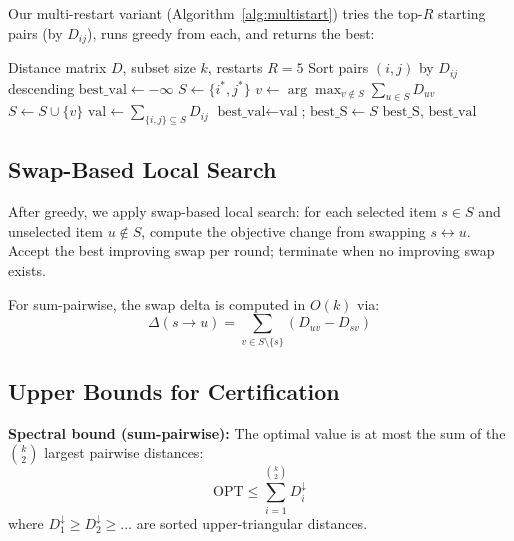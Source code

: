 \documentclass[11pt,a4paper]{article}
\begin{document}
Our multi-restart variant (Algorithm~\ref{alg:multistart}) tries the top-$R$ starting pairs (by $D_{ij}$), runs greedy from each, and returns the best:

\begin{algorithm}[h]
\caption{Multi-Restart Greedy for Sum-Pairwise}
\label{alg:multistart}
\begin{algorithmic}[1]
\REQUIRE Distance matrix $D$, subset size $k$, restarts $R=5$
\STATE Sort pairs $(i,j)$ by $D_{ij}$ descending
\STATE $\text{best\_val} \gets -\infty$
    \STATE $S \gets \{i^*, j^*\}$
        \STATE $v \gets \arg\max_{v \notin S} \sum_{u \in S} D_{uv}$
        \STATE $S \gets S \cup \{v\}$
    \ENDWHILE
    \STATE $\text{val} \gets \sum_{\{i,j\} \subseteq S} D_{ij}$
        \STATE $\text{best\_val} \gets \text{val}$; $\text{best\_S} \gets S$
    \ENDIF
\ENDFOR
\RETURN $\text{best\_S}$, $\text{best\_val}$
\end{algorithmic}
\end{algorithm}

\subsection{Swap-Based Local Search}

After greedy, we apply swap-based local search: for each selected item $s \in S$ and unselected item $u \notin S$, compute the objective change from swapping $s \leftrightarrow u$. Accept the best improving swap per round; terminate when no improving swap exists.

For sum-pairwise, the swap delta is computed in $O(k)$ via:
\begin{equation}
    \Delta(s \to u) = \sum_{v \in S \setminus \{s\}} (D_{uv} - D_{sv})
\end{equation}

\subsection{Upper Bounds for Certification}

\textbf{Spectral bound (sum-pairwise):} The optimal value is at most the sum of the $\binom{k}{2}$ largest pairwise distances:
\begin{equation}
    \text{OPT} \leq \sum_{i=1}^{\binom{k}{2}} D^{\downarrow}_i
\end{equation}
where $D^{\downarrow}_1 \geq D^{\downarrow}_2 \geq \ldots$ are sorted upper-triangular distances.
\end{document}
